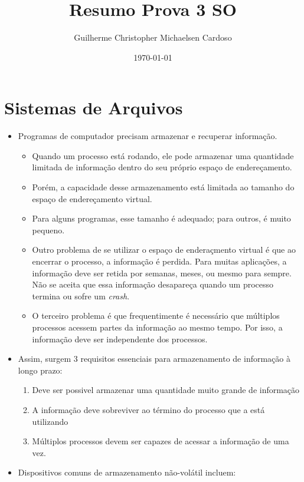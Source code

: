 \documentclass[10pt]{article}
\title{Resumo Prova 3 SO}
\author{Guilherme Christopher Michaelsen Cardoso}
\date{\today}
\begin{document}
\lstset{language=C}
\maketitle

\section{Sistemas de Arquivos}
\begin{itemize}
    \item Programas de computador precisam armazenar e recuperar informação.
    \begin{itemize}
        \item Quando um processo está rodando, ele pode armazenar uma quantidade
        limitada de informação dentro do seu próprio espaço de endereçamento.
        \item Porém, a capacidade desse armazenamento está limitada ao tamanho
        do espaço de endereçamento virtual. 
        \item Para alguns programas, esse tamanho é adequado; para outros, é muito
        pequeno.
        \item Outro problema de se utilizar o espaço de enderaçmento virtual é
        que ao encerrar o processo, a informação é perdida. Para muitas aplicações,
        a informação deve ser retida por semanas, meses, ou mesmo para sempre. 
        Não se aceita que essa informação desapareça quando um processo termina ou
        sofre um \textit{crash}.
        \item O terceiro problema é que frequentimente é necessário que múltiplos
        processos acessem partes da informação ao mesmo tempo. Por isso, a informação
        deve ser independente dos processos.
    \end{itemize}
    \item Assim, surgem 3 requisitos essenciais para armazenamento de informação à 
    longo prazo:
    \begin{enumerate}
        \item Deve ser possivel armazenar uma quantidade muito grande de informação
        \item A informação deve sobreviver ao término do processo que a está utilizando
        \item Múltiplos processos devem ser capazes de acessar a informação de uma vez.
    \end{enumerate}
    \item Dispositivos comuns de armazenamento não-volátil incluem:

\end{itemize}
\end{document}
